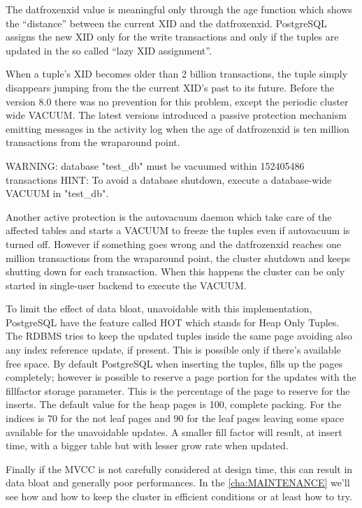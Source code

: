 The datfroxenxid value is meaningful only through the age function which shows the
``distance'' between the current XID and the datfroxenxid. PostgreSQL assigns the new 
XID only for the write transactions and only if the tuples are updated in the so called ``lazy XID 
assignment''.\newline 


When a tuple's XID becomes older than 2 billion transactions, the tuple simply disappears  jumping 
from the the current XID's past to its future. Before the version 8.0 there was no prevention
for this problem, except the periodic cluster wide VACUUM. The latest versions introduced a 
passive protection mechanism emitting messages in the activity log when the age of datfrozenxid is  
ten million transactions from the wraparound point.

\begin{smallverbatim}
WARNING:  database "test_db" must be vacuumed within 152405486 transactions
HINT:  To avoid a database shutdown, execute a database-wide VACUUM in 
"test_db".
\end{smallverbatim}

Another active protection is the autovacuum daemon which take care of the affected tables and 
starts a VACUUM to freeze the tuples even  if autovacuum is turned off. However if something goes 
wrong and the datfrozenxid reaches one million transactions from the wraparound point, the 
cluster shutdown and keeps shutting down for each transaction. When this happens the cluster 
can be only  started in single-user backend to execute the VACUUM.\newline

To limit the effect of data bloat, unavoidable with this implementation,  PostgreSQL have the 
feature called HOT which stands for Heap Only Tuples. The RDBMS tries to keep 
the updated tuples inside the same page avoiding also any index reference update, if present. This 
is possible only if there's available free space. By default PostgreSQL when inserting the 
tuples, fills up the pages completely; however is possible to reserve a page portion for the 
updates with the fillfactor storage parameter. This is the 
percentage of the page to reserve for the inserts. The default value for the heap pages is 100, 
complete packing. For the indices is 70 for the not leaf pages and 90 for the leaf pages leaving 
some space available for the unavoidable updates. A smaller fill factor will result, at insert time, 
with a bigger table but with lesser grow rate when updated. \newline

Finally if the MVCC is not carefully considered at design time, this can result in data bloat and 
generally poor performances.
In the \ref{cha:MAINTENANCE} we'll see how and how to keep the cluster in efficient conditions or 
at least how to try.